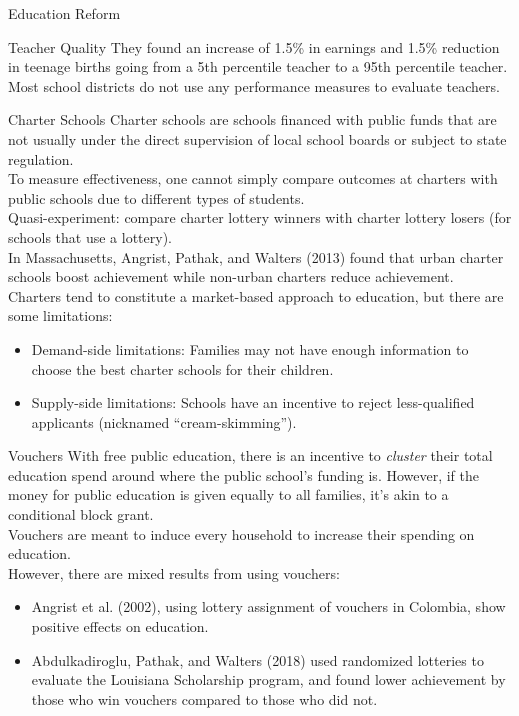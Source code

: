 \documentclass[10pt]{extarticle}
\begin{document}
\begin{problem}{Education Reform}
\begin{problem}{Teacher Quality}
      They found an increase of 1.5\% in earnings and 1.5\% reduction in teenage births going from a 5th percentile teacher to a 95th percentile teacher.\\

      Most school districts do not use any performance measures to evaluate teachers.
    \end{problem}
    \begin{problem}{Charter Schools}
      Charter schools are schools financed with public funds that are not usually under the direct supervision of local school boards or subject to state regulation.\\

      To measure effectiveness, one cannot simply compare outcomes at charters with public schools due to different types of students.\\

      Quasi-experiment: compare charter lottery winners with charter lottery losers (for schools that use a lottery).\\

      In Massachusetts, Angrist, Pathak, and Walters (2013) found that urban charter schools boost achievement while non-urban charters reduce achievement.\\

      Charters tend to constitute a market-based approach to education, but there are some limitations:
      \begin{itemize}
        \item Demand-side limitations: Families may not have enough information to choose the best charter schools for their children.
        \item Supply-side limitations: Schools have an incentive to reject less-qualified applicants (nicknamed ``cream-skimming'').
      \end{itemize}
    \end{problem}
    \begin{problem}{Vouchers}
      With free public education, there is an incentive to \textit{cluster} their total education spend around where the public school's funding is. However, if the money for public education is given equally to all families, it's akin to a conditional block grant.\\

      Vouchers are meant to induce every household to increase their spending on education.\\

      However, there are mixed results from using vouchers:
      \begin{itemize}
        \item Angrist et al. (2002), using lottery assignment of vouchers in Colombia, show positive effects on education.
        \item Abdulkadiroglu, Pathak, and Walters (2018) used randomized lotteries to evaluate the Louisiana Scholarship program, and found lower achievement by those who win vouchers compared to those who did not.
      \end{itemize}
    \end{problem}
  \end{problem}
\end{document}
